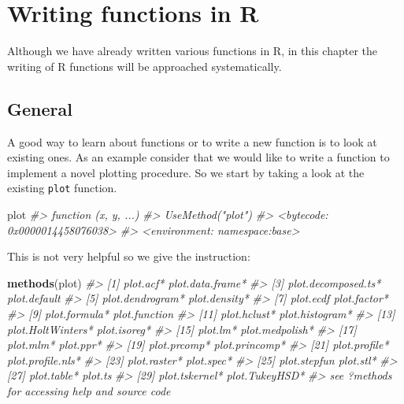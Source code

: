 \documentclass[
]{book}
\newenvironment{Shaded}{\begin{snugshade}}{\end{snugshade}}
\newcommand{\CommentTok}[1]{\textcolor[rgb]{0.56,0.35,0.01}{\textit{#1}}}
\newcommand{\FunctionTok}[1]{\textcolor[rgb]{0.13,0.29,0.53}{\textbf{#1}}}
\newcommand{\NormalTok}[1]{#1}
\begin{document}
\chapter{Writing functions in R}\label{functions}

Although we have already written various functions in R, in this chapter the writing of R functions will be approached systematically.

\section{General}\label{general-2}

A good way to learn about functions or to write a new function is to look at existing ones. As an example consider that we would like to write a function to implement a novel plotting procedure. So we start by taking a look at the existing \texttt{plot} function.

\begin{Shaded}
\begin{Highlighting}[]
\NormalTok{plot}
\CommentTok{\#\textgreater{} function (x, y, ...) }
\CommentTok{\#\textgreater{} UseMethod("plot")}
\CommentTok{\#\textgreater{} \textless{}bytecode: 0x0000014458076038\textgreater{}}
\CommentTok{\#\textgreater{} \textless{}environment: namespace:base\textgreater{}}
\end{Highlighting}
\end{Shaded}

This is not very helpful so we give the instruction:

\begin{Shaded}
\begin{Highlighting}[]
\FunctionTok{methods}\NormalTok{(plot)}
\CommentTok{\#\textgreater{}  [1] plot.acf*           plot.data.frame*   }
\CommentTok{\#\textgreater{}  [3] plot.decomposed.ts* plot.default       }
\CommentTok{\#\textgreater{}  [5] plot.dendrogram*    plot.density*      }
\CommentTok{\#\textgreater{}  [7] plot.ecdf           plot.factor*       }
\CommentTok{\#\textgreater{}  [9] plot.formula*       plot.function      }
\CommentTok{\#\textgreater{} [11] plot.hclust*        plot.histogram*    }
\CommentTok{\#\textgreater{} [13] plot.HoltWinters*   plot.isoreg*       }
\CommentTok{\#\textgreater{} [15] plot.lm*            plot.medpolish*    }
\CommentTok{\#\textgreater{} [17] plot.mlm*           plot.ppr*          }
\CommentTok{\#\textgreater{} [19] plot.prcomp*        plot.princomp*     }
\CommentTok{\#\textgreater{} [21] plot.profile*       plot.profile.nls*  }
\CommentTok{\#\textgreater{} [23] plot.raster*        plot.spec*         }
\CommentTok{\#\textgreater{} [25] plot.stepfun        plot.stl*          }
\CommentTok{\#\textgreater{} [27] plot.table*         plot.ts            }
\CommentTok{\#\textgreater{} [29] plot.tskernel*      plot.TukeyHSD*     }
\CommentTok{\#\textgreater{} see \textquotesingle{}?methods\textquotesingle{} for accessing help and source code}
\end{Highlighting}
\end{Shaded}
\end{document}
